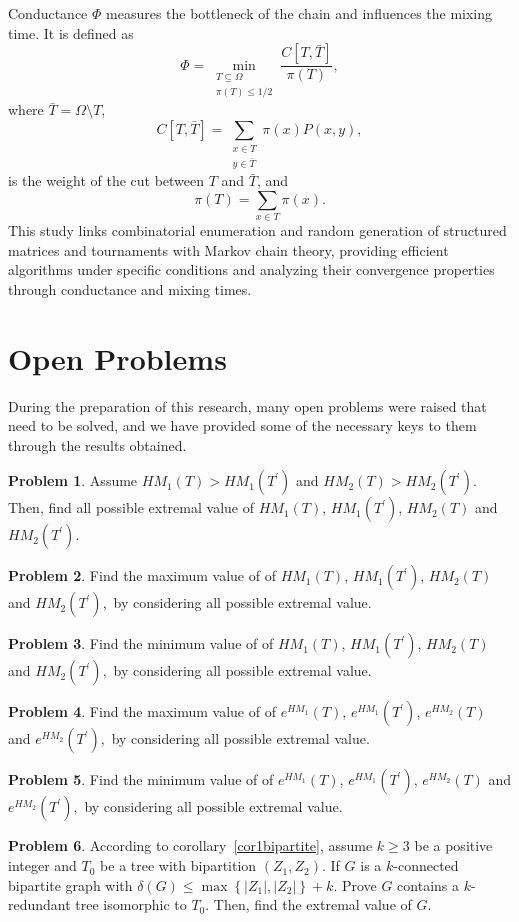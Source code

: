 \documentclass{article}
\theoremstyle{definition}
\newtheorem{problem}{Problem}[section]
\begin{document}
Conductance $\Phi$ measures the bottleneck of the chain and influences the mixing time. It is defined as 
\[
\Phi = \min_{\substack{T \subseteq \Omega \\ \pi(T) \leq 1/2}} \frac{C[T, \bar{T}]}{\pi(T)},
\]
where $\bar{T} = \Omega \setminus T$, 
\[
C[T, \bar{T}] = \sum_{\substack{x \in T \\ y \in \bar{T}}} \pi(x) P(x,y),
\]
is the weight of the cut between $T$ and $\bar{T}$, and 
\[
\pi(T) = \sum_{x \in T} \pi(x).
\]
This study links combinatorial enumeration and random generation of structured matrices and tournaments with Markov chain theory, providing efficient algorithms under specific conditions and analyzing their convergence properties through conductance and mixing times.

 

\section{Open Problems}
During the preparation of this research, many open problems were raised that need to be solved, and we have provided some of the necessary keys to them through the results obtained.
\begin{problem}
Assume $H M_{1}(T)>H M_{1}\left(T^{\prime}\right)$ and $H M_{2}(T)>H M_{2}\left(T^{\prime}\right)$. Then, find all possible extremal value of $H M_{1}(T)$, $H M_{1}\left(T^{\prime}\right)$, $H M_{2}(T)$ and $H M_{2}\left(T^{\prime}\right).$
\end{problem}
\begin{problem}
Find the maximum value of of $H M_{1}(T)$, $H M_{1}\left(T^{\prime}\right)$, $H M_{2}(T)$ and $H M_{2}\left(T^{\prime}\right),$ by considering all possible extremal value.
\end{problem}
\begin{problem}
Find the minimum value of of $H M_{1}(T)$, $H M_{1}\left(T^{\prime}\right)$, $H M_{2}(T)$ and $H M_{2}\left(T^{\prime}\right),$ by considering all possible extremal value.
\end{problem}
\begin{problem}
Find the maximum value of of $e^{H M_{1}}(T)$, $e^{H M_{1}}\left(T^{\prime}\right)$, $e^{H M_{2}}(T)$ and $e^{H M_{2}}\left(T^{\prime}\right),$ by considering all possible extremal value.
\end{problem}
\begin{problem}
Find the minimum value of of  $e^{H M_{1}}(T)$, $e^{H M_{1}}\left(T^{\prime}\right)$, $e^{H M_{2}}(T)$ and $e^{H M_{2}}\left(T^{\prime}\right),$ by considering all possible extremal value.
\end{problem}
\begin{problem}
According to corollary~\ref{cor1bipartite}, assume $k \geq 3$ be a positive integer and $T_0$ be a tree with bipartition $\left(Z_1, Z_2\right)$. If $G$ is a $k$-connected bipartite graph with $\delta(G) \leq \max \left\{\left|Z_1\right|,\left|Z_2\right|\right\}+k$. Prove $G$ contains a $k$-redundant tree isomorphic to $T_0$. Then, find the extremal value of $G$.
\end{problem}
\end{document}
